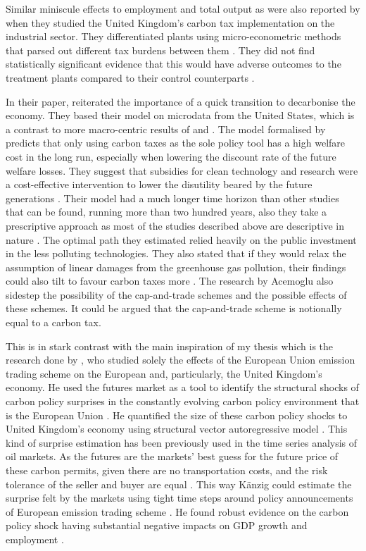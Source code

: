 \documentclass[
  12pt,
  a4paper,
]{report}
\begin{document}
Similar miniscule effects to employment and total output as \citet{metcalf2020} were also reported by \citet{martin2014} when they studied the United Kingdom's carbon tax implementation on the industrial sector. They differentiated plants using micro-econometric methods that parsed out different tax burdens between them \citep{martin2014}. They did not find statistically significant evidence that this would have adverse outcomes to the treatment plants compared to their control counterparts \citep{martin2014}.

In their paper, \citet{acemoglu2016} reiterated the importance of a quick transition to decarbonise the economy. They based their model on microdata from the United States, which is a contrast to more macro-centric results of \citet{metcalf2020} and \citet{andersson2019}. The model formalised by \citeauthor{acemoglu2016} predicts that only using carbon taxes as the sole policy tool has a high welfare cost in the long run, especially when lowering the discount rate of the future welfare losses. They suggest that subsidies for clean technology and research were a cost-effective intervention to lower the disutility beared by the future generations \citep{acemoglu2016}. Their model had a much longer time horizon than other studies that can be found, running more than two hundred years, also they take a prescriptive approach as most of the studies described above are descriptive in nature \citep{acemoglu2016}. The optimal path they estimated relied heavily on the public investment in the less polluting technologies. They also stated that if they would relax the assumption of linear damages from the greenhouse gas pollution, their findings could also tilt to favour carbon taxes more \citep{acemoglu2016}. The research by Acemoglu also sidestep the possibility of the cap-and-trade schemes and the possible effects of these schemes. It could be argued that the cap-and-trade scheme is notionally equal to a carbon tax.

This is in stark contrast with the main inspiration of my thesis which is the research done by \citet{kaenzig2022}, who studied solely the effects of the European Union emission trading scheme on the European and, particularly, the United Kingdom's economy. He used the futures market as a tool to identify the structural shocks of carbon policy surprises in the constantly evolving carbon policy environment that is the European Union \citep{kaenzig2022}. He quantified the size of these carbon policy shocks to United Kingdom's economy using structural vector autoregressive model \citep{kaenzig2022}. This kind of surprise estimation has been previously used in the time series analysis of oil markets. As the futures are the markets' best guess for the future price of these carbon permits, given there are no transportation costs, and the risk tolerance of the seller and buyer are equal \citep{nakamura2018}. This way Känzig could estimate the surprise felt by the markets using tight time steps around policy announcements of European emission trading scheme \citep{kaenzig2022}. He found robust evidence on the carbon policy shock having substantial negative impacts on GDP growth and employment \citep{kaenzig2022}.
\end{document}
